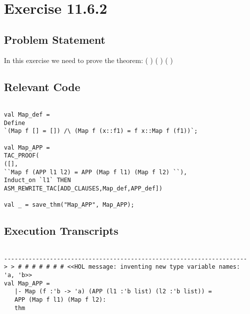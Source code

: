 \documentclass{report}
\begin{document}
 \chapter{Exercise 11.6.2}
 \label{cha:exercise-11.6.2}
  
 \section{Problem Statement}
 \label{sec:problem-statement-2}

In this exercise we need to prove the theorem:
\HOLTokenTurnstile{}   (  ) \HOLSymConst{=}  (  ) (  )

\section{Relevant Code}
\label{sec:relevant-code-2}
 \lstset{frameround=fftt}
\begin{lstlisting}[frame=tRBL]

val Map_def =
Define
`(Map f [] = []) /\ (Map f (x::f1) = f x::Map f (f1))`;

val Map_APP =
TAC_PROOF(
([],
``Map f (APP l1 l2) = APP (Map f l1) (Map f l2) ``),
Induct_on `l1` THEN
ASM_REWRITE_TAC[ADD_CLAUSES,Map_def,APP_def])

val _ = save_thm("Map_APP", Map_APP);

\end{lstlisting}


\section{Execution Transcripts}
\label{sec:exec-transcr-2}

\setcounter{sessioncount}{0}
\begin{session}
  \begin{scriptsize}
\begin{verbatim}

---------------------------------------------------------------------
> > # # # # # # # <<HOL message: inventing new type variable names: 'a, 'b>>
val Map_APP =
   |- Map (f :'b -> 'a) (APP (l1 :'b list) (l2 :'b list)) =
   APP (Map f l1) (Map f l2):
   thm

\end{verbatim}
  \end{scriptsize}
\end{session}
\end{document}

